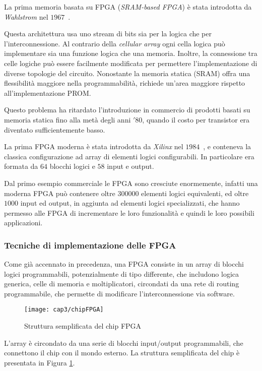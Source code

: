 La prima memoria basata su FPGA (\textit{SRAM-based FPGA}) è stata introdotta da \textit{Wahlstrom} nel $1967$~\cite{wahl}. 

Questa architettura usa uno stream di bits sia per la logica che per l'interconnessione. Al contrario della \textit{cellular array} ogni cella logica può implementare sia una funzione logica che una memoria. Inoltre, la connessione tra celle logiche può essere facilmente modificata per permettere l'implementazione di diverse topologie del circuito. Nonostante la memoria statica (SRAM) offra una flessibilità maggiore nella programmabilità, richiede un'area maggiore rispetto all'implementazione PROM.

Questo problema ha ritardato l'introduzione in commercio di prodotti basati su memoria statica fino alla metà degli anni $'80$, quando il costo per transistor era diventato sufficientemente basso.

La prima FPGA moderna è stata introdotta da \textit{Xilinx} nel $1984$~\cite{reconfgate}, e conteneva la classica configurazione ad array di elementi logici configurabili. In particolare era formata da $64$ blocchi logici e $58$ input e output. 

Dal primo esempio commerciale le FPGA sono cresciute enormemente, infatti una moderna FPGA può contenere oltre $300000$ elementi logici equivalenti, ed oltre $1000$ input ed output, in aggiunta ad elementi logici specializzati, che hanno permesso alle FPGA di incrementare le loro funzionalità e quindi le loro possibili applicazioni.

\subsubsection{Tecniche di implementazione delle FPGA}
Come già accennato in precedenza, una FPGA consiste in un array di blocchi logici programmabili, potenzialmente di tipo differente, che includono logica generica, celle di memoria e moltiplicatori, circondati da una rete di routing programmabile, che permette di modificare l'interconnessione via software.

\begin{figure}[H]  
  \begin{center}
    \texttt{[image: cap3/chipFPGA]}
    \caption{Struttura semplificata del chip FPGA}
    \label{chipFPGA}
  \end{center}
\end{figure}
L'array è circondato da una serie di blocchi input/output programmabili, che connettono il chip con il mondo esterno. La struttura semplificata del chip è presentata in Figura \ref{chipFPGA}.

